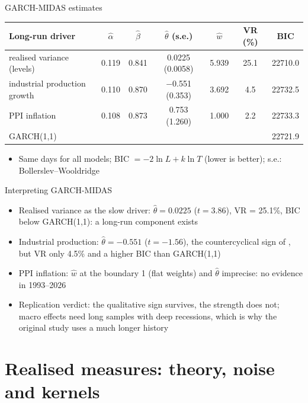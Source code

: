 \begin{frame}{GARCH-MIDAS estimates}
\itemsize{\small}
\begin{center}
\scriptsize
\begin{tabular}{lcccccc}
\toprule
\textbf{Long-run driver} & $\hat\alpha$ & $\hat\beta$ & $\hat\theta$ (s.e.) & $\hat w$ & VR (\%) & BIC \\
\midrule
realised variance (levels) & 0.119 & 0.841 & 0.0225 (0.0058) & 5.939 & 25.1 & 22710.0 \\
industrial production growth & 0.110 & 0.870 & \ensuremath{-}0.551 (0.353) & 3.692 & 4.5 & 22732.5 \\
PPI inflation & 0.108 & 0.873 & 0.753 (1.260) & 1.000 & 2.2 & 22733.3 \\
GARCH(1,1) & & & & & & 22721.9 \\
\bottomrule
\end{tabular}
\end{center}
\begin{itemize}
    \item Same days for all models; BIC $= -2\ln L + k\ln T$ (lower is better); s.e.: Bollerslev--Wooldridge
\end{itemize}
\end{frame}

\begin{frame}{Interpreting GARCH-MIDAS}
\itemsize{\small}
\begin{itemize}
    \item Realised variance as the slow driver: $\hat\theta = 0.0225$ ($t = 3.86$), VR = 25.1\%, BIC below GARCH(1,1): a long-run component exists
    \item Industrial production: $\hat\theta = \ensuremath{-}0.551$ ($t = \ensuremath{-}1.56$), the countercyclical sign of , but VR only 4.5\% and a higher BIC than GARCH(1,1)
    \item PPI inflation: $\hat w$ at the boundary 1 (flat weights) and $\hat\theta$ imprecise: no evidence in 1993--2026
    \item Replication verdict: the qualitative sign survives, the strength does not; macro effects need long samples with deep recessions, which is why the original study uses a much longer history
\end{itemize}
\end{frame}


\section{Realised measures: theory, noise and kernels}

